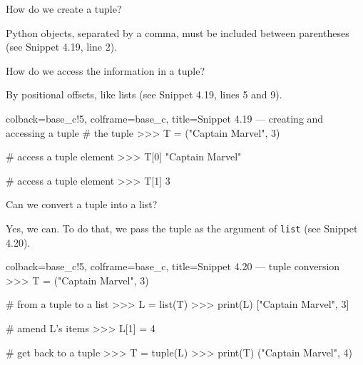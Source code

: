 \documentclass[a4paper,11pt]{book}
\numberwithin{figure}{chapter}
\numberwithin{table}{chapter}
\newcommand{\question}[1]{%
    \begin{tcolorbox}[colback=comp_c!10,colframe=comp_c,sidebyside align=top,width=\linewidth,before skip=1ex]
        #1
    \end{tcolorbox}%
    \switchcolumn%
}
\newcommand{\note}[1]{%
    \begin{tcolorbox}[colback=white!0,colframe=white!10,width=\linewidth,before skip=1ex]
        #1
    \end{tcolorbox}         
}
\begin{document}
\begin{paracol}{2}
	\question{\raggedright How do we create a tuple?}
	\note{Python objects, separated by a comma, must be included between parentheses (see Snippet 4.19, line 2).}
\end{paracol}

\begin{paracol}{2}
	\question{\raggedright How do we access the information in a tuple?}
	\note{By positional offsets, like lists (see Snippet 4.19, lines 5 and 9).}
\end{paracol}

\begin{pythoncode}[linenos=true,]{colback=base_c!5, colframe=base_c, title=\sffamily Snippet 4.19 --- creating and accessing a tuple}
# the tuple
>>> T = ("Captain Marvel", 3)

# access a tuple element
>>> T[0]
"Captain Marvel"

# access a tuple element
>>> T[1]
3
\end{pythoncode}

\begin{paracol}{2}
	\question{\raggedright Can we convert a tuple into a list?}
	\note{Yes, we can. To do that, we pass the tuple as the argument of \texttt{list} (see Snippet 4.20).}
\end{paracol}

\begin{pythoncode}[linenos=true,]{colback=base_c!5, colframe=base_c, title=\sffamily Snippet 4.20 --- tuple conversion}
>>> T = ("Captain Marvel", 3)

# from a tuple to a list
>>> L = list(T)
>>> print(L)
["Captain Marvel", 3]

# amend L's items
>>> L[1] = 4

# get back to a tuple
>>> T = tuple(L)
>>> print(T)
("Captain Marvel", 4)
\end{pythoncode}
\clearpage
\end{document}
